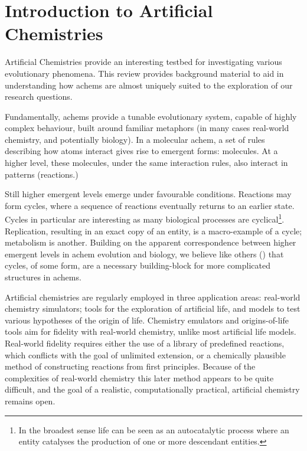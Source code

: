 \chapter{Introduction to Artificial Chemistries}\label{introduction-to-achems}

Artificial Chemistries provide an interesting testbed for investigating various evolutionary phenomena. This review  provides background material to aid in understanding how \glspl{achem} are almost uniquely suited to the exploration of our research questions.

Fundamentally, \glspl{achem} provide a tunable evolutionary system, capable of highly complex behaviour, built around familiar metaphors (in many cases real-world chemistry, and potentially biology). In a molecular \gls{achem}, a set of rules describing how atoms interact gives rise to emergent forms: molecules. At a higher level, these molecules, under the same interaction rules, also interact in patterns (reactions.)

Still higher emergent levels emerge under favourable conditions. Reactions may form cycles, where a sequence of reactions eventually returns to an earlier state. Cycles in particular are interesting as many biological processes are cyclical\footnote{In the broadest sense life can be seen as an autocatalytic process where an entity catalyses the production of one or more descendant entities.}. Replication, resulting in an exact copy of an entity, is a macro-example of a cycle; metabolism is another. Building on the apparent correspondence between higher emergent levels in \gls{achem} evolution and biology, we believe like others (\eg \textcite{Steel2013}) that cycles, of some form, are a necessary building-block for more complicated structures in \glspl{achem}.

Artificial chemistries are regularly employed in three application areas: real-world chemistry simulators; tools for the exploration of artificial life, and models to test various hypotheses of the origin of life. Chemistry emulators and origins-of-life tools aim for fidelity with real-world chemistry, unlike most artificial life models. Real-world fidelity requires either the use of a library of predefined reactions, which conflicts with the goal of unlimited extension, or a chemically plausible method of constructing reactions from first principles. Because of the complexities of real-world chemistry this later method appears to be quite difficult, and the goal of a realistic, computationally practical, artificial chemistry remains open. 

